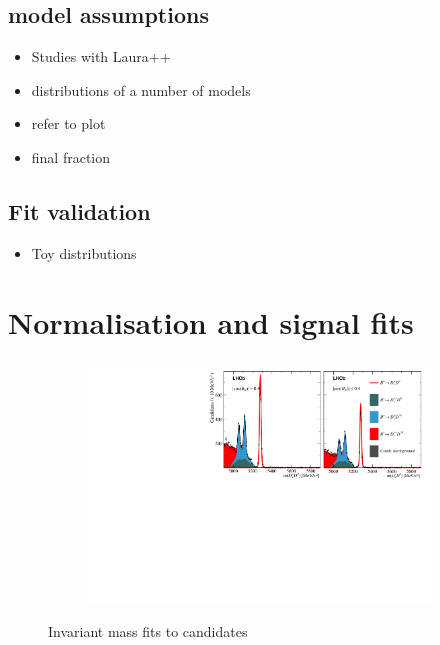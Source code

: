 \subsection{\decay{\Bp}{\Dsp \Kp \Km} model assumptions}
\label{sec:B2DsPhi_B2DsKKModel}

{\color{Red}
\begin{itemize}
\item Studies with Laura++
\item distributions of a number of models
\item refer to \Dsp\Kp\Km plot
\item final fraction
\end{itemize}
}

\subsection{Fit validation}
\label{sec:B2DsPhi_fitstrategy}

{\color{Red}
\begin{itemize}
\item Toy distributions
\end{itemize}
}

\section{Normalisation and signal fits}




\begin{figure}[!h]
    \centering
    \begin{subfigure}[t]{1.0\textwidth}
        \includegraphics[width=1.0\textwidth]{figs/Appendix_FitCategories/canvas_DsD0_merged_both_summed_splitHel_splitKKPi_s21_s21r1_s24_s26.pdf}
    \end{subfigure}
    \caption{Invariant mass fits to \decay{\Bp}{\Dsp\Dzb} candidates}
\end{figure}


